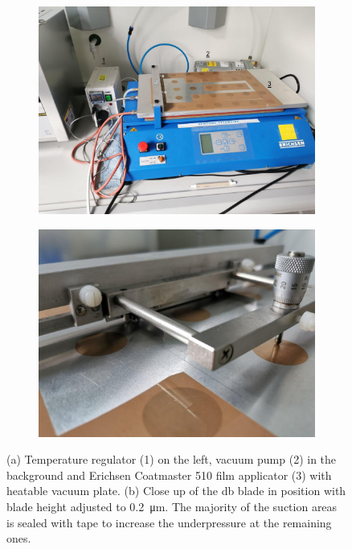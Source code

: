 \begin{figure}
	\centering
	\begin{subfigure}{.49\textwidth}
		\centering
		\includegraphics[width=.99\textwidth]{Pics/erichsen1.png}
		\caption{}
	\end{subfigure}
	\begin{subfigure}{.49\textwidth}
		\centering
		\includegraphics[width=.99\textwidth]{Pics/erichsendb1.png}
		\caption{}
	\end{subfigure}
	\caption{
		(a)
		Temperature regulator (1) on the left,
		vacuum pump (2) in the background and 
		Erichsen Coatmaster 510 film applicator (3) with heatable vacuum plate.
        (b) Close up of the \gls{db} blade in position with blade height adjusted to \SI{0.2}{\micro\meter}.
		The majority of the suction areas is sealed with tape to increase the underpressure at the remaining ones.
	}
	\label{fig:eric}
\end{figure}


